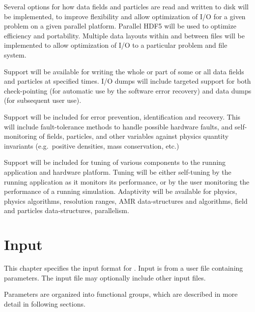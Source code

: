 \documentclass{book}
\begin{document}

   Several options for how data fields and particles are read and
   written to disk will be implemented, to improve flexibility and
   allow optimization of I/O for a given problem on a given parallel
   platform.  Parallel HDF5 will be used to optimize efficiency and
   portability.  Multiple data layouts within and between files will
   be implemented to allow optimization of I/O to a particular problem
   and file system.


   Support will be available for writing the whole or part of some or
   all data fields and particles at specified times.  I/O dumps will
   include targeted support for both check-pointing (for automatic use
   by the software error recovery) and data dumps (for subsequent user
   use).  
   

   Support will be included for error prevention, identification and
   recovery.  This will include fault-tolerance methods to handle
   possible hardware faults, and self-monitoring of fields, particles,
   and other variables against physics quantity invariants
   (e.g.~positive densities, mass conservation, etc.)


   Support will be included for tuning of various components to the
   running application and hardware platform.  Tuning will be either
   self-tuning by the running application as it monitors its
   performance, or by the user monitoring the performance of a running
   simulation.  Adaptivity will be available for physics, physics
   algorithms, resolution ranges, AMR data-structures and algorithms,
   field and particles data-structures, parallelism.

\chapter{Input} \label{s:inputs}

   This chapter specifies the input format for \cello.  Input is from
   a user file containing parameters.  The input file may optionally
   include other input files.

   Parameters are organized into functional groups, which are described
   in more detail in following sections.
\end{document}
